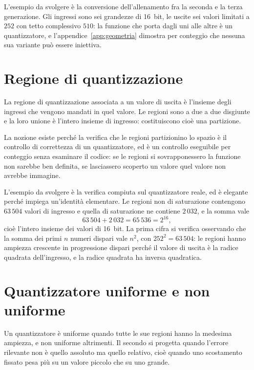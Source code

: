 L'esempio da svolgere è la conversione dell'allenamento fra la seconda e la terza generazione. Gli ingressi sono sei grandezze di \SI{16}{bit}, le uscite sei valori limitati a $252$ con tetto complessivo $510$: la funzione che porta dagli uni alle altre è un quantizzatore, e l'appendice~\ref{app:geometria} dimostra per conteggio che nessuna sua variante può essere iniettiva.

\section{Regione di quantizzazione}

La regione di quantizzazione associata a un valore di uscita è l'insieme degli ingressi che vengono mandati in quel valore. Le regioni sono a due a due disgiunte e la loro unione è l'intero insieme di ingresso: costituiscono cioè una partizione.

La nozione esiste perché la verifica che le regioni partizionino lo spazio è il controllo di correttezza di un quantizzatore, ed è un controllo eseguibile per conteggio senza esaminare il codice: se le regioni si sovrapponessero la funzione non sarebbe ben definita, se lasciassero scoperto un valore quel valore non avrebbe immagine.

L'esempio da svolgere è la verifica compiuta sul quantizzatore reale, ed è elegante perché impiega un'identità elementare. Le regioni non di saturazione contengono $63\,504$ valori di ingresso e quella di saturazione ne contiene $2\,032$, e la somma vale
\begin{equation}
63\,504 + 2\,032 = 65\,536 = 2^{16},
\end{equation}
cioè l'intero insieme dei valori di \SI{16}{bit}. La prima cifra si verifica osservando che la somma dei primi $n$ numeri dispari vale $n^2$, con $252^2 = 63\,504$: le regioni hanno ampiezza crescente in progressione dispari perché il valore di uscita è la radice quadrata dell'ingresso, e la radice quadrata ha inversa quadratica.

\section{Quantizzatore uniforme e non uniforme}

Un quantizzatore è uniforme quando tutte le sue regioni hanno la medesima ampiezza, e non uniforme altrimenti. Il secondo si progetta quando l'errore rilevante non è quello assoluto ma quello relativo, cioè quando uno scostamento fissato pesa più su un valore piccolo che su uno grande.

